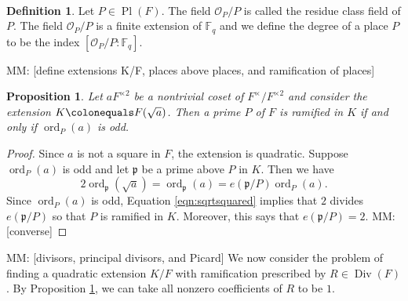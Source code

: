 \documentclass{dcthesis}
\newcommand{\defi}[1]{\textsf{#1}}
\newcommand{\mm}[1]{{\color{blue} \sf MM: [#1]}}
\newcommand{\FF}{\mathbb{F}}
\DeclareMathOperator{\Div}{Div}
\DeclareMathOperator{\ord}{ord}
\DeclareMathOperator{\Pl}{Pl}
\numberwithin{equation}{section}
\newtheorem{prop}[equation]{Proposition}
\theoremstyle{definition}
\newtheorem{definition}[equation]{Definition}
\theoremstyle{remark}
\begin{document}
{{\begin{align}
    \end{align}
    \begin{definition}
      \label{def:residueclassfield}
      Let $P\in\Pl(F)$.
      The field $\mathcal{O}_P/P$ is called the
      \defi{residue class field} of $P$.
      The field $\mathcal{O}_P/P$ is a finite
      extension of $\FF_q$
      and we define the
      \defi{degree of a place $P$}
      to be the index
      $[\mathcal{O}_P/P:\FF_q]$.
    \end{definition}
    \mm{define extensions K/F, places above places, and ramification of places}
    \begin{prop}
      \label{prop:kummerramification}
      Let $aF^{\times 2}$ be a nontrivial
      coset of $F^\times/F^{\times 2}$
      and consider the extension
      $K\colonequals F(\sqrt{a})$.
      Then a prime $P$ of $F$ is ramified
      in $K$ if and only if
      $\ord_P(a)$ is odd.
    \end{prop}
    \begin{proof}
      Since $a$ is not a square in $F$,
      the extension is quadratic.
      Suppose $\ord_P(a)$ is odd
      and let $\mathfrak{p}$ be
      a prime above $P$ in $K$.
      Then we have
      \begin{equation}
        \label{eqn:sqrtsquared}
        2\ord_{\mathfrak{p}}(\sqrt{a})
        = \ord_{\mathfrak{p}}(a)
        = e(\mathfrak{p}/P)\ord_P(a).
      \end{equation}
      Since $\ord_P(a)$ is odd,
      Equation \ref{eqn:sqrtsquared}
      implies that $2$ divides
      $e(\mathfrak{p}/P)$ so that
      $P$ is ramified in $K$.
      Moreover, this says that
      $e(\mathfrak{p}/P) = 2$.
      \mm{converse}
    \end{proof}
    \mm{divisors, principal divisors, and Picard}
    We now consider the problem of
    finding a quadratic extension $K/F$
    with ramification prescribed by
    $R\in\Div(F)$.
    By Proposition
    \ref{prop:kummerramification},
    we can take all nonzero coefficients
    of $R$ to be $1$.
  }
}
\end{document}
